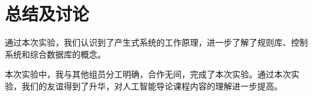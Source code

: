 \documentclass[forprint]{WHUBachelor}
\begin{document}
\chapter{总结及讨论}

通过本次实验，我们认识到了产生式系统的工作原理，进一步了解了规则库、控制系统和综合数据库的概念。

本次实验中，我与其他组员分工明确，合作无间，完成了本次实验。通过本次实验，我们的友谊得到了升华，对人工智能导论课程内容的理解进一步提高。

\cleardoublepage{}
{}
%




\appendix
\end{document}
